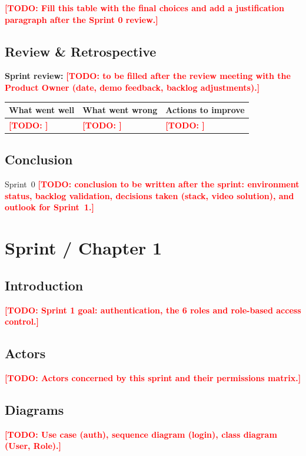 \documentclass[12pt,a4paper]{report}
\newcommand{\todo}[1]{\textcolor{red}{\textbf{[TODO: #1]}}}
\begin{document}
\todo{Fill this table with the final choices and add a justification paragraph after
the Sprint 0 review.}

\section{Review \& Retrospective}

\textbf{Sprint review:} \todo{to be filled after the review meeting with the Product
Owner (date, demo feedback, backlog adjustments).}

\begin{center}
\begin{tabular}{p{4.6cm} p{4.6cm} p{4.6cm}}
\toprule
\textbf{What went well} & \textbf{What went wrong} & \textbf{Actions to improve} \\
\midrule
\todo{} & \todo{} & \todo{} \\
\bottomrule
\end{tabular}
\end{center}

\section{Conclusion}

Sprint~0 \todo{conclusion to be written after the sprint: environment status, backlog
validation, decisions taken (stack, video solution), and outlook for Sprint~1.}

\clearpage

\chapter{Sprint / Chapter 1}

\section{Introduction}
\todo{Sprint 1 goal: authentication, the 6 roles and role-based access control.}

\section{Actors}
\todo{Actors concerned by this sprint and their permissions matrix.}

\section{Diagrams}
\todo{Use case (auth), sequence diagram (login), class diagram (User, Role).}
\end{document}
